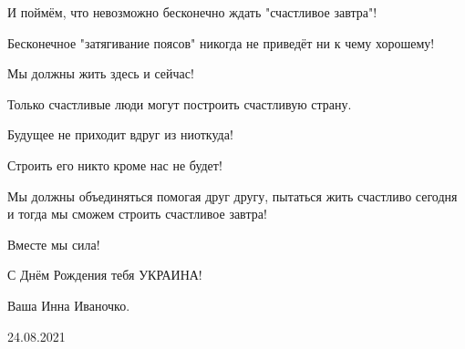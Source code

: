И поймём, что невозможно бесконечно ждать "счастливое завтра"! 

Бесконечное "затягивание поясов"  никогда не приведёт ни к чему хорошему! 

Мы должны жить здесь и сейчас! 

Только счастливые люди могут построить счастливую страну. 

Будущее не приходит вдруг из ниоткуда! 

Строить его никто кроме нас не будет! 

Мы должны объединяться  помогая друг другу, пытаться жить счастливо сегодня и
тогда мы сможем строить счастливое завтра! 

Вместе мы сила!

С  Днём Рождения тебя УКРАИНА!

Ваша Инна Иваночко.

24.08.2021

